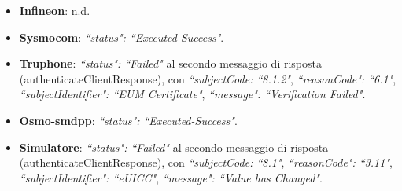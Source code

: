 \documentclass[10pt, oneside]{book}
\begin{document}
\begin{itemize}
\item \textbf{Infineon}: n.d.
\item \textbf{Sysmocom}: \textit{``status": ``Executed-Success"}.
\item \textbf{Truphone}: \textit{``status": ``Failed"} al secondo messaggio di risposta (authenticateClientResponse), con \textit{``subjectCode: ``8.1.2"}, \textit{``reasonCode": ``6.1"}, \textit{``subjectIdentifier": ``EUM Certificate"}, \textit{``message": ``Verification Failed"}.
\item \textbf{Osmo-smdpp}: \textit{``status": ``Executed-Success"}.
\item \textbf{Simulatore}: \textit{``status": ``Failed"} al secondo messaggio di risposta (authenticateClientResponse), con \textit{``subjectCode: ``8.1"}, \textit{``reasonCode": ``3.11"}, \textit{``subjectIdentifier": ``eUICC"}, \textit{``message": ``Value has Changed"}.
\end{itemize}
\end{document}
